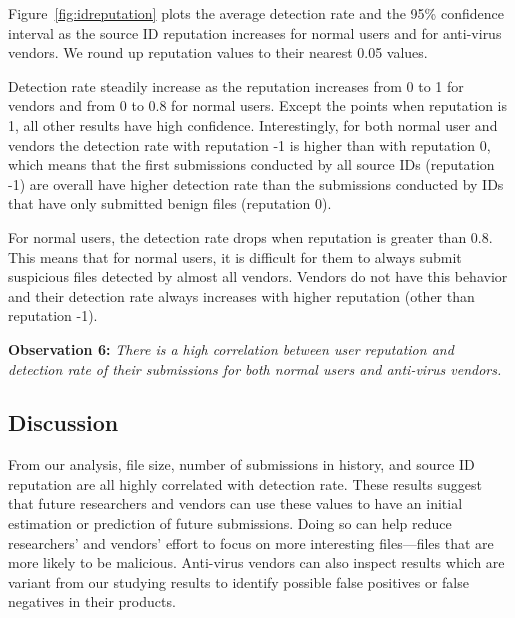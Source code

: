Figure~\ref{fig:idreputation} plots the average detection rate and the 95\% confidence interval 
as the source ID reputation increases for normal users and for anti-virus vendors.
We round up reputation values to their nearest 0.05 values. 

Detection rate steadily increase as the reputation increases from 0 to 1 for vendors and from 0 to 0.8 for normal users.
Except the points when reputation is 1, all other results have high confidence.
Interestingly, for both normal user and vendors the detection rate with reputation -1 is higher than with reputation 0,
which means that the first submissions conducted by all source IDs (reputation -1) 
are overall have higher detection rate than 
the submissions conducted by IDs that have only submitted benign files (reputation 0).

For normal users, the detection rate drops when reputation is greater than 0.8.
This means that for normal users, it is difficult for them to always submit suspicious files detected by almost all vendors.
Vendors do not have this behavior and their detection rate always increases with higher reputation (other than reputation -1).


{\bf Observation 6:} 
{\em There is a high correlation between user reputation and detection rate of their submissions for both normal users and anti-virus vendors.}


\subsection{Discussion}

From our analysis, file size, number of submissions in history, and source ID reputation
are all highly correlated with detection rate. 
These results suggest that future researchers and vendors can use these values to have an initial estimation or prediction of future submissions.
Doing so can help reduce researchers' and vendors' effort to focus on more interesting files---files that are more likely to be malicious.
Anti-virus vendors can also inspect results which are variant from our studying results 
to identify possible false positives or false negatives in their products. 


